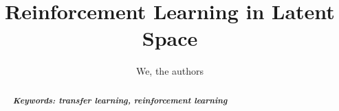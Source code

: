 \documentclass[11pt]{article}
\title{Reinforcement Learning in Latent Space}
\author{We, the authors}
\begin{document}
\maketitle
\begin{abstract}

\lipsum[1]

{{\it \bf Keywords: transfer learning, reinforcement learning}}
\end{abstract}
 



%



{\tiny\printbibliography}

\clearpage
\raggedbottom
\appendix
\begin{appendix}
\end{appendix}
\end{document}
